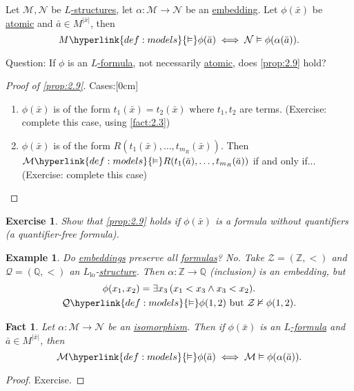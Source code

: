 \documentclass{article}
\let\models\vDash
\let\nModels\nvDash
\newtheorem{nexample}[nthm]{Example}
\newtheorem{nexercise}[nthm]{Exercise}
\newtheorem{nfact}[nthm]{Fact}
\begin{document}
\begin{nprop}\label{prop:2.9}
  Let $\mathcal{M}, \mathcal{N}$ be \hyperlink{def:str}{$L$-structures}, let $\alpha: \mathcal{M} \to \mathcal{N}$ be an \hyperlink{def:embedding}{embedding}.
  Let $\phi(\bar{x})$ be \hyperlink{def:atomform}{atomic} and $\bar{a} \in M^{|\bar{x}|}$, then
  \begin{equation*}
    M \hyperlink{def:models}{\models} \phi(\bar{a}) \iff \mathcal{N} \models \phi(\alpha(\bar{a})).
  \end{equation*}
\end{nprop}

Question: If $\phi$ is an \hyperlink{def:form}{$L$-formula}, not necessarily \hyperlink{def:atomform}{atomic}, does \cref{prop:2.9} hold?

\begin{proof}[Proof of \cref{prop:2.9}]
  Cases:[0cm]
  \begin{enumerate}[label=(\roman*)]
    \item $\phi(\bar{x})$ is of the form $t_1(\bar{x}) = t_2(\bar{x})$ where $t_1,t_2$ are terms.
      (Exercise: complete this case, using \cref{fact:2.3})
    \item $\phi(\bar{x})$ is of the form $R(t_1(\bar{x}), \dotsc, t_{m_R}(\bar{x}))$.
      Then $\mathcal{M} \hyperlink{def:models}{\models} R(t_1(\bar{a}), \dotsc, t_{m_R}(\bar{a}))$ if and only if...
      (Exercise: complete this case)
  \end{enumerate}
\end{proof}
\begin{nexercise}\label{ex:2.10}
  Show that \cref{prop:2.9} holds if $\phi(\bar{x})$ is a formula without quantifiers (a quantifier-free formula).
\end{nexercise}
\begin{nexample}\label{ex:2.11}
  Do \hyperlink{def:embedding}{embeddings} preserve \emph{all} \hyperlink{def:form}{formulas}? No.
  Take $\mathcal{Z} = (\mathbb{Z}, <)$ and $\mathcal{Q} = (\mathbb{Q}, <)$ an \hyperlink{def:lgp}{$L_{\text{lo}}$}-\hyperlink{def:str}{structure}.
  Then $\alpha: \mathbb{Z} \to \mathbb{Q}$ (inclusion) is an embedding, but
  \begin{gather*}
    \phi(x_1, x_2) = \exists x_3\,(x_1 < x_3 \wedge x_3 < x_2). \\
    \mathcal{Q} \hyperlink{def:models}{\models} \phi(1,2) \text{ but } \mathcal{Z} \nModels \phi(1,2).
  \end{gather*}
\end{nexample}
\begin{nfact}\label{fact:2.12}
  Let $\alpha: \mathcal{M} \to \mathcal{N}$ be an \hyperlink{def:iso}{isomorphism}.
  Then if $\phi(\bar{x})$ is an \hyperlink{def:form}{$L$-formula} and $\bar{a} \in M^{|\bar{x}|}$, then
  \begin{equation*}
    \mathcal{M} \hyperlink{def:models}{\models} \phi(\bar{a}) \iff \mathcal{M} \models \phi(\alpha(\bar{a})).
  \end{equation*}
\end{nfact}
\begin{proof}
  Exercise.
\end{proof}
\end{document}
